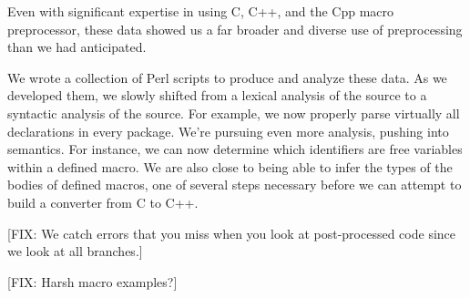 Even with significant expertise in using C, C++, and the Cpp macro
preprocessor, these data showed us a far broader and diverse use of
preprocessing than we had anticipated.  

We wrote a collection of Perl scripts to produce and analyze these
data.  As we developed them, we slowly shifted from a lexical analysis
of the source to a syntactic analysis of the source.  For example, we
now properly parse virtually all declarations in every package.  We're
pursuing even more analysis, pushing into semantics.  For instance, we
can now determine which identifiers are free variables within a defined
macro.  We are also close to being able to infer the types of the bodies
of defined macros, one of several steps necessary before we can attempt
to build a converter from C to C++.

[FIX: We catch errors that you miss when you look at post-processed code
since we look at all branches.]

[FIX: Harsh macro examples?]


\small 


